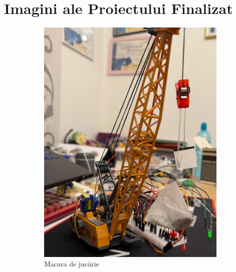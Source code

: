 \chapter{Imagini ale Proiectului Finalizat}

\begin{figure}[h!]
  \centering

  \begin{subfigure}[b]{0.3\textwidth} %
      \includegraphics[width=\textwidth]{figures/1.jpg}
      \caption{Macara de jucărie}
  \end{subfigure}
  \hfill
  \begin{subfigure}[b]{0.3\textwidth} %

\end{subfigure}
\end{figure}
